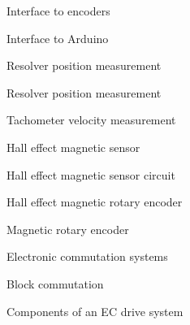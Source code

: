 \documentclass[compress]{beamer}
\begin{document}
{
    \begin{frame}{Interface to encoders}
    \end{frame}
}

{
    \begin{frame}{Interface to Arduino}
    \end{frame}
}

{
    \begin{frame}{Resolver position measurement}
    \end{frame}
}

{
    \begin{frame}{Resolver position measurement}
    \end{frame}
}

{
    \begin{frame}{Tachometer velocity measurement}
    \end{frame}
}

{
    \begin{frame}{Hall effect magnetic sensor}
    \end{frame}
}

{
    \begin{frame}{Hall effect magnetic sensor circuit}
    \end{frame}
}

{
    \begin{frame}{Hall effect magnetic rotary encoder}
    \end{frame}
}

{
    \begin{frame}{Magnetic rotary encoder}
    \end{frame}
}

{
    \begin{frame}{Electronic commutation systems}
    \end{frame}
}

{
    \begin{frame}{Block commutation}
    \end{frame}
}

{
    \begin{frame}{Components of an EC drive system}
    \end{frame}
}
\end{document}

